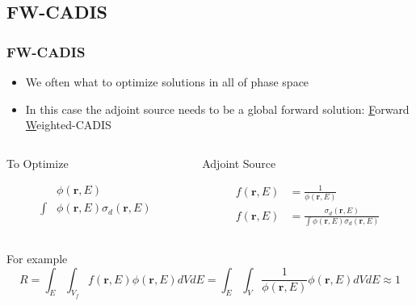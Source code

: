 \documentclass[xcolor=x11names,compress]{beamer}
\renewcommand{\(}{\begin{columns}}
\renewcommand{\)}{\end{columns}}
\newcommand{\<}[1]{\begin{column}{#1}}
\renewcommand{\>}{\end{column}}
\newcommand{\ve}[1]{\ensuremath{\mathbf{#1}}}
\begin{document}
\subsection{FW-CADIS}
\begin{frame}[fragile]
  \frametitle{FW-CADIS}

\begin{itemize}
\item We often what to optimize solutions in all of phase space\\
\item In this case the adjoint source needs to be a global forward solution: \underline{F}orward \underline{W}eighted-CADIS
\end{itemize}
%
\begin{columns}
  \begin{column}{0.5\textwidth}
  \begin{center}
  \textcolor{byellow}{To Optimize}
  \end{center}
	\begin{align}
  	&\phi(\ve{r}, E)\nonumber \\
  	\int&\phi(\ve{r}, E)\sigma_d(\ve{r}, E)\nonumber
  	\end{align}
  \end{column}
  \begin{column}{0.5\textwidth}
  \begin{center}
  \textcolor{byellow}{Adjoint Source}
  \end{center}
  	\begin{align}
  	f(\ve{r}, E) &= \frac{1}{\phi(\ve{r}, E)}\nonumber \\
  	f(\ve{r}, E) &= \frac{\sigma_d(\ve{r}, E)}{\int\phi(\ve{r}, E)\sigma_d(\ve{r}, E)} \nonumber
  	\end{align}
  \end{column}
\end{columns}
\vspace*{1 em}
For example
%
\begin{equation}
 R = \int_E \int_{V_f} f(\ve{r}, E) \phi(\ve{r}, E) dV dE = \int_E \int_{V} \frac{1}{\phi(\ve{r}, E)} \phi(\ve{r}, E) dV dE \approx 1 \nonumber
\end{equation}

\end{frame}

\end{document}
